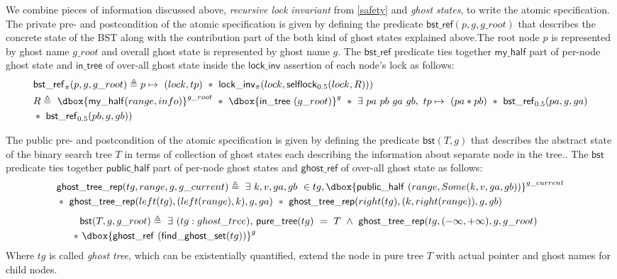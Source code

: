 \documentclass[acmsmall,screen]{acmart}\settopmatter{printfolios=true}
\newcommand\dboxed[1]{\dbox{\ensuremath{#1}}}
\newcommand{\ghost}[2]{\ensuremath{\dboxed{#1}^{#2}}}
\newcommand{\treerep}{\ensuremath{\mathsf{bst}}}
\newcommand{\nodeboxrep}{\ensuremath{\mathsf{bst\_ref}}}
\begin{document}
We combine pieces of information discussed above, \emph{recursive lock invariant} from \ref{safety} and \emph{ghost states}, to write the atomic specification. The private pre- and postcondition of the atomic specification is given by defining the predicate $\nodeboxrep(p,g,g\_root)$ that describes the concrete state of the BST along with the contribution part of the both kind of ghost states explained above.The root node $p$ is represented by ghost name $g\_root$ and overall ghost state is represented by ghost name $g$. The $\nodeboxrep$ predicate ties together $\mathsf{my\_half}$ part of per-node ghost state and $\mathsf{in\_tree}$ of over-all ghost state inside the $\mathsf{lock\_inv}$ assertion of each node's lock as follows:
\begin{align*}
    &\nodeboxrep_{\pi}(p,g,g\_root) \triangleq  p\mapsto\ (lock,tp)\ *\ \mathsf{lock\_inv_{\pi}}(lock, \mathsf{selflock}_{0.5}(lock,R))) \\&R  \triangleq\ \ghost{\mathsf{my\_half}(range,info)}{g\_root}\ *\ \ghost{\mathsf{in\_tree}\ (g\_root)}{g}\ *\ \exists\ pa\ pb\ ga\ gb,\ tp\mapsto\ (pa * pb)\ *\  \nodeboxrep_{0.5}(pa,g,ga) \\& *\ \nodeboxrep_{0.5}(pb,g,gb))\end{align*}
    
The public pre- and postcondition of the atomic specification is given by defining the predicate $\treerep(T,g)$ that describes the abstract state of the binary search tree $T$  in terms of collection of ghost states each describing the information about separate node in the tree.. The $\treerep$ predicate ties together $\mathsf{public\_half}$ part of per-node ghost states and $\mathsf{ghost\_ref}$ of over-all ghost state as follows: \begin{align*}&\mathsf{ghost\_tree\_rep}(tg,range, g, g\_current) \triangleq\ \exists\ k, v, ga, gb\ \in tg,\ghost{\mathsf{public\_half}\ (range, Some(k,v,ga,gb))}{g\_current}\\& *\ \mathsf{ghost\_tree\_rep}(left(tg),(left(range),k),g,ga)\ *\ \mathsf{ghost\_tree\_rep}(right(tg),(k, right(range)),g,gb) \end{align*}
\begin{align*}\treerep(T,g,g\_root) \triangleq \ \exists\ (tg:ghost\_tree),\ &\mathsf{pure\_tree}(tg)\ =\ T\ \land\ \mathsf{ghost\_tree\_rep}(tg,(-\infty, +\infty),g,g\_root)&\\ *\ \ghost{\mathsf{ghost\_ref}\ (\mathsf{find\_ghost\_set}(tg))}{g}\end{align*}
Where $tg$ is called \emph{ghost tree}, which can be existentially quantified, extend the node in pure tree $T$ with actual pointer and ghost names for child nodes. 
\end{document}
